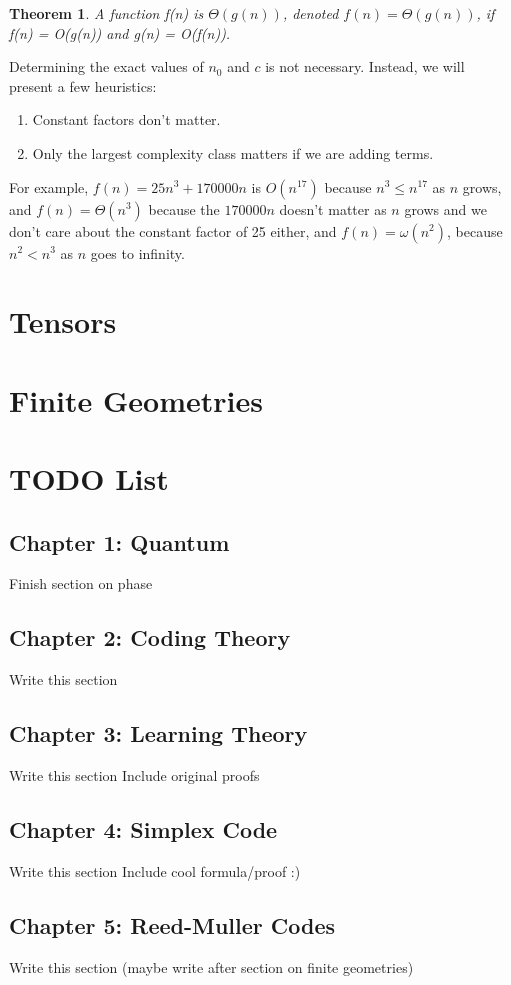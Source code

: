 \documentclass[12pt,twoside]{reedthesis}
\newtheorem{theorem}{Theorem}
\begin{document}
\begin{theorem}
A function f(n) is $\Theta(g(n))$, denoted $f(n) = \Theta(g(n))$, if f(n) = O(g(n)) and g(n) = O(f(n)).
\end{theorem}

Determining the exact values of $n_0$ and $c$ is not necessary. Instead, we will present a few heuristics:
\begin{enumerate}
\item Constant factors don't matter. 
\item Only the largest complexity class matters if we are adding terms.
\end{enumerate}
For example, $f(n)= 25n^3 + 170000n$ is $O(n^{17})$ because $n^3 \leq n^{17} $ as $n$ grows, and $f(n) = \Theta(n^3)$ because the $170000n$ doesn't matter as $n$ grows and we don't care about the constant factor of 25 either, and $f(n) = \omega(n^2)$, because $n^2 < n^3$ as $n$ goes to infinity.

	
\chapter{Tensors}
\chapter{Finite Geometries}
\chapter{TODO List}
      \section{Chapter 1: Quantum}
      Finish section on phase
      \section{Chapter 2: Coding Theory}
      Write this section
      \section{Chapter 3: Learning Theory}
      Write this section
      Include original proofs
      \section{Chapter 4: Simplex Code}
      Write this section
      Include cool formula/proof :)
      \section{Chapter 5: Reed-Muller Codes}
      Write this section (maybe write after section on finite geometries)
\end{document}
